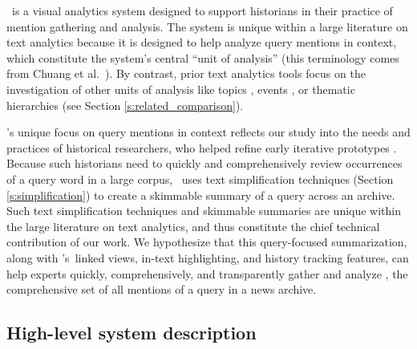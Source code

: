 
\ours~is a visual analytics system designed to support historians in their practice of mention gathering and analysis.
The system is unique within a large literature on text analytics because it is designed to help analyze query mentions in context, which constitute the system's central ``unit of analysis'' (this terminology comes from Chuang et al.\ \cite{chuangheer}). 
By contrast, prior text analytics tools focus on the investigation of other units of analysis like topics \cite{tiara}, events \cite{eventriver}, or thematic hierarchies \cite{overview} (see Section \ref{s:related_comparison}).

\ours's unique focus on query mentions in context reflects our study into the needs and practices of historical researchers, who helped refine early iterative prototypes \cite{GouldClayton}.
Because such historians need to quickly and comprehensively review occurrences of a query word in a large corpus, \ours~uses text simplification techniques (Section \ref{s:simplification}) to create a skimmable summary of a query across an archive. 
Such text simplification techniques and skimmable summaries are unique within the large literature on text analytics, and thus constitute the chief technical contribution of our work.
We hypothesize that this query-focused summarization, along with \ours's~linked views, in-text highlighting, and history tracking features, can help experts quickly, comprehensively, and transparently gather and analyze \mentions, the comprehensive set of all mentions of a query in a news archive.

\subsection{High-level system description}\label{s:highlevell}

